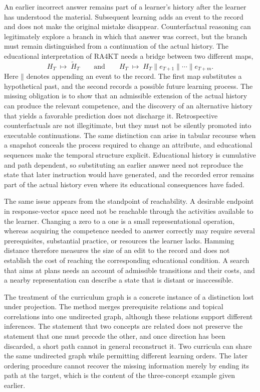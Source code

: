 \documentclass[11pt]{article}
\newcommand{\Hist}{H}
\begin{document}
An earlier incorrect answer remains part of a learner's history after the learner has understood the material. Subsequent learning adds an event to the record and does not make the original mistake disappear. Counterfactual reasoning can legitimately explore a branch in which that answer was correct, but the branch must remain distinguished from a continuation of the actual history. The educational interpretation of RA4KT needs a bridge between two different maps,
\[
\Hist_T\;\longmapsto\;\widetilde{\Hist}_T
\qquad\text{and}\qquad
\Hist_T\;\longmapsto\;\Hist_T\mathbin{\|}e_{T+1}\mathbin{\|}\cdots\mathbin{\|}e_{T+m}.
\]
Here $\mathbin{\|}$ denotes appending an event to the record. The first map substitutes a hypothetical past, and the second records a possible future learning process. The missing obligation is to show that an admissible extension of the actual history can produce the relevant competence, and the discovery of an alternative history that yields a favorable prediction does not discharge it. Retrospective counterfactuals are not illegitimate, but they must not be silently promoted into executable continuations. The same distinction can arise in tabular recourse when a snapshot conceals the process required to change an attribute, and educational sequences make the temporal structure explicit. Educational history is cumulative and path dependent, so substituting an earlier answer need not reproduce the state that later instruction would have generated, and the recorded error remains part of the actual history even where its educational consequences have faded.

The same issue appears from the standpoint of reachability. A desirable endpoint in response-vector space need not be reachable through the activities available to the learner. Changing a zero to a one is a small representational operation, whereas acquiring the competence needed to answer correctly may require several prerequisites, substantial practice, or resources the learner lacks. Hamming distance therefore measures the size of an edit to the record and does not establish the cost of reaching the corresponding educational condition. A search that aims at plans needs an account of admissible transitions and their costs, and a nearby representation can describe a state that is distant or inaccessible.

The treatment of the curriculum graph is a concrete instance of a distinction lost under projection. The method merges prerequisite relations and topical correlations into one undirected graph, although these relations support different inferences. The statement that two concepts are related does not preserve the statement that one must precede the other, and once direction has been discarded, a short path cannot in general reconstruct it. Two curricula can share the same undirected graph while permitting different learning orders. The later ordering procedure cannot recover the missing information merely by ending its path at the target, which is the content of the three-concept example given earlier.
\end{document}
